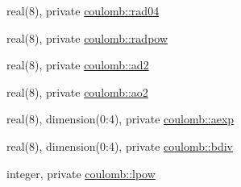 \begin{DoxyCompactItemize}
\item 
real(8), private \hyperlink{namespacecoulomb_a313ec73163c8cb8f31d822c4d0efb479}{coulomb\+::rad04}
\item 
real(8), private \hyperlink{namespacecoulomb_a8f7cac5e6ca7d551c55d4d3a4ba5ecbe}{coulomb\+::radpow}
\item 
real(8), private \hyperlink{namespacecoulomb_afda3f373d6098c0a75ede859f3529343}{coulomb\+::ad2}
\item 
real(8), private \hyperlink{namespacecoulomb_ab0ad8726c53cebe490cc86d05629aa7d}{coulomb\+::ao2}
\item 
real(8), dimension(0\+:4), private \hyperlink{namespacecoulomb_a22c47ac5a6dd966aa0d24fa79c553716}{coulomb\+::aexp}
\item 
real(8), dimension(0\+:4), private \hyperlink{namespacecoulomb_a1c828ee6bc3b2445d27ed8ce44d78300}{coulomb\+::bdiv}
\item 
integer, private \hyperlink{namespacecoulomb_a3a24d1e9e066766553253e002f7114e0}{coulomb\+::lpow}
\end{DoxyCompactItemize}

